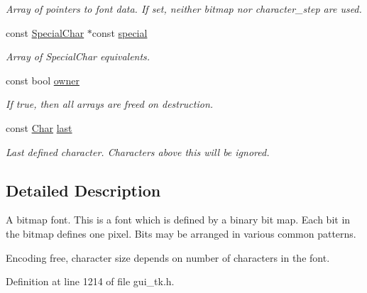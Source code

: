 \begin{DoxyCompactItemize}
\begin{DoxyCompactList}\small\item\em Array of pointers to font data. If set, neither {\itshape bitmap\/} nor {\itshape character\-\_\-step\/} are used. \end{DoxyCompactList}\item 
const \hyperlink{classGUI_1_1Font_af3c234cd3febe27dbe9c76e6cc5cad3a}{Special\-Char} $\ast$const \hyperlink{classGUI_1_1BitmapFont_a46f912c496e902dfc614e25261599718}{special}
\begin{DoxyCompactList}\small\item\em Array of Special\-Char equivalents. \end{DoxyCompactList}\item 
\hypertarget{classGUI_1_1BitmapFont_ac50042f33fedf2c8516294780ed6f128}{const bool \hyperlink{classGUI_1_1BitmapFont_ac50042f33fedf2c8516294780ed6f128}{owner}}\label{classGUI_1_1BitmapFont_ac50042f33fedf2c8516294780ed6f128}

\begin{DoxyCompactList}\small\item\em If {\ttfamily true}, then all arrays are freed on destruction. \end{DoxyCompactList}\item 
\hypertarget{classGUI_1_1BitmapFont_a3c992d29bbd0d35087365a8e5474686c}{const \hyperlink{namespaceGUI_af6b04b46d40197b4f00e553d7d1a3e4c}{Char} \hyperlink{classGUI_1_1BitmapFont_a3c992d29bbd0d35087365a8e5474686c}{last}}\label{classGUI_1_1BitmapFont_a3c992d29bbd0d35087365a8e5474686c}

\begin{DoxyCompactList}\small\item\em Last defined character. Characters above this will be ignored. \end{DoxyCompactList}\end{DoxyCompactItemize}


\subsection{Detailed Description}
A bitmap font. This is a font which is defined by a binary bit map. Each bit in the bitmap defines one pixel. Bits may be arranged in various common patterns. 

Encoding free, character size depends on number of characters in the font. 

Definition at line 1214 of file gui\-\_\-tk.\-h.




